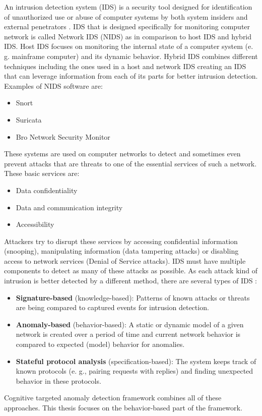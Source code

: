\documentclass[thesis=B,english]{FITthesis}[2012/10/20]
\begin{document}
An intrusion detection system (IDS) is a security tool designed for identification of unauthorized use or abuse of computer systems by both system insiders and external penetrators \cite{mukherjee1994network}.
IDS that is designed specifically for monitoring computer network is called Network IDS (NIDS) as in comparison to host IDS and hybrid IDS.
Host IDS focuses on monitoring the internal state of a computer system (e. g. mainframe computer) and its dynamic behavior.
Hybrid IDS combines different techniques including the ones used in a host and network IDS creating an IDS that can leverage information from each of its parts for better intrusion detection.
Examples of NIDS software are:
\begin{itemize}
    \item Snort
    \item Suricata
    \item Bro Network Security Monitor
\end{itemize}
These systems are used on computer networks to detect and sometimes even prevent attacks that are threats to one of the essential services of such a network.
These basic services are\cite{mukherjee1994network}:
\begin{itemize}
    \item Data confidentiality
    \item Data and communication integrity
    \item Accessibility
\end{itemize}
Attackers try to disrupt these services by accessing confidential information (snooping), manipulating information (data tampering attacks) or disabling access to network services (Denial of Service attacks).
IDS must have multiple components to detect as many of these attacks as possible.
As each attack kind of intrusion is better detected by a different method, there are several types of IDS \cite{liao2013intrusion}:
\begin{itemize}
    \item \textbf{Signature-based} (knowledge-based): Patterns of known attacks or threats are being compared to captured events for intrusion detection.
    \item \textbf{Anomaly-based} (behavior-based): A static or dynamic model of a given network is created over a period of time and current network behavior is compared to expected (model) behavior for anomalies.
    \item \textbf{Stateful protocol analysis} (specification-based): The system keeps track of known protocols (e. g., pairing requests with replies) and finding unexpected behavior in these protocols.
\end{itemize}
Cognitive targeted anomaly detection framework combines all of these approaches.
This thesis focuses on the behavior-based part of the framework.
\end{document}
